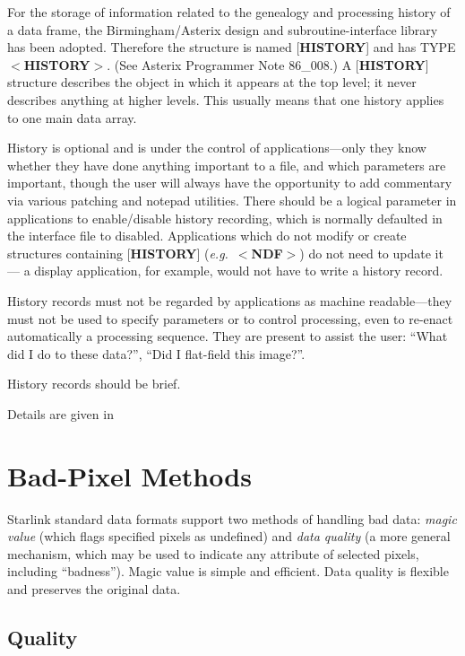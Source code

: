 \documentclass[twoside,11pt,nolof,noabs]{starlink}
\begin{document}
For the storage of information related to the genealogy and
processing history of a data frame, the
Birmingham/Asterix design and subroutine-interface library
has been adopted.  Therefore the structure is named
{[}\textbf{HISTORY}{]} and has TYPE $<$\textbf{HISTORY}$>$.  (See
Asterix Programmer Note 86\_008.)
A {[}\textbf{HISTORY}{]} structure describes
the object in which it appears at the top level;
it never describes anything at higher levels.
This usually means that one history applies to one
main data array.

History is optional and is under the control of applications---only
they know whether they have done anything important to a file, and which
parameters are important, though the user will always
have the opportunity to add commentary via various patching
and notepad utilities.  There
should be a logical parameter in applications to enable/disable history
recording, which is normally defaulted in the interface file to
disabled.  Applications which do not modify or create structures containing
{[}\textbf{HISTORY}{]} (\textit{e.g.}\
$<$\textbf{NDF}$>$) do not need to update it ---
a display
application, for example, would not have to write a history
record.

History records must not be regarded by applications as
machine readable---they must not be used to specify parameters
or to control processing, even to re-enact automatically
a processing sequence.  They are present to assist the user:
``What did I do to these data?'', ``Did I flat-field this image?''.

History records should be brief.

Details are given in \html{\htmlref{$<$\textbf{HISTORY}$>$
Structure.}{se:history}}

\section{Bad-Pixel Methods\label{se:badpixel}}

Starlink standard data formats support two
methods of handling bad data: \textit{magic value} (which
flags specified pixels as undefined)
and \textit{data quality} (a more general mechanism, which may
be used to indicate any attribute of selected pixels, including
``badness'').  Magic value is simple
and efficient.  Data quality
is flexible and preserves the original data.

\subsection{Quality\label{se:quality}}
\end{document}
